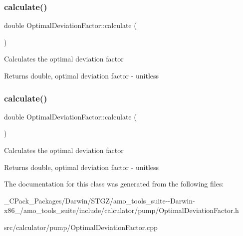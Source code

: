\subsubsection{\texorpdfstring{calculate()}{calculate()}\hspace{0.1cm}{\footnotesize\ttfamily [2/3]}}
{\footnotesize\ttfamily double Optimal\+Deviation\+Factor\+::calculate (\begin{DoxyParamCaption}{ }\end{DoxyParamCaption})}

Calculates the optimal deviation factor \begin{DoxyReturn}{Returns}
double, optimal deviation factor -\/ unitless 
\end{DoxyReturn}
\mbox{\label{class_optimal_deviation_factor_aaa6687bb46d275c4cbcfe44caf895a37}} 
\subsubsection{\texorpdfstring{calculate()}{calculate()}\hspace{0.1cm}{\footnotesize\ttfamily [3/3]}}
{\footnotesize\ttfamily double Optimal\+Deviation\+Factor\+::calculate (\begin{DoxyParamCaption}{ }\end{DoxyParamCaption})}

Calculates the optimal deviation factor \begin{DoxyReturn}{Returns}
double, optimal deviation factor -\/ unitless 
\end{DoxyReturn}


The documentation for this class was generated from the following files\+:\begin{DoxyCompactItemize}
\item 
\+\_\+\+C\+Pack\+\_\+\+Packages/\+Darwin/\+S\+T\+G\+Z/amo\+\_\+tools\+\_\+suite-\/-\/\+Darwin-\/x86\+\_/amo\+\_\+tools\+\_\+suite/include/calculator/pump/Optimal\+Deviation\+Factor.\+h\item 
src/calculator/pump/Optimal\+Deviation\+Factor.\+cpp\end{DoxyCompactItemize}
